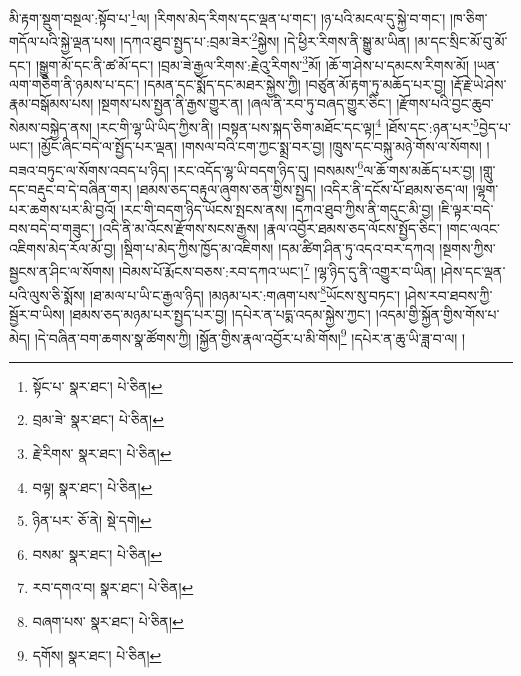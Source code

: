 མི་རྟག་སྡུག་བསྔལ་:སྟོབ་པ་\footnote{སྟོང་པ་  སྣར་ཐང་།  པེ་ཅིན། }ལ། །རིགས་མེད་རིགས་དང་ལྡན་པ་གང་། །ཉ་པའི་མངལ་དུ་སྐྱེ་བ་གང་། །ཁ་ཅིག་གདོལ་པའི་སྐྱེ་ལྡན་པས། །དཀའ་ཐུབ་སྤྱད་པ་:བྲམ་ཟེར་\footnote{བྲམ་ཟེ་  སྣར་ཐང་།  པེ་ཅིན། }སྐྱེས། །དེ་ཕྱིར་རིགས་ནི་སྒྱུ་མ་ཡིན། །མ་དང་སྲིང་མོ་བུ་མོ་དང་། །སྒྱུག་མོ་དང་ནི་ཚ་མོ་དང་། །བྲམ་ཟེ་རྒྱལ་རིགས་:རྗེའུ་རིགས་\footnote{རྗེ་རིགས་  སྣར་ཐང་།  པེ་ཅིན། }མོ། །ཆོ་ག་ཤེས་པ་དམངས་རིགས་མོ། །ཡན་ལག་གཅིག་ནི་ཉམས་པ་དང་། །དམན་དང་སྨོད་དང་མཐར་སྐྱེས་ཀྱི། །བཙུན་མོ་རྟག་ཏུ་མཆོད་པར་བྱ། །རྡོ་རྗེ་ཡེ་ཤེས་རྣམ་བསྒོམས་པས། །སྔགས་པས་སྤྱན་ནི་རྒྱས་གྱུར་ན། །ཞལ་ནི་རབ་ཏུ་བཞད་གྱུར་ཅིང་། །རྫོགས་པའི་བྱང་ཆུབ་སེམས་བསྐྱེད་ནས། །རང་གི་ལྷ་ཡི་ཡིད་ཀྱིས་ནི། །བསྟན་པས་སྐད་ཅིག་མཐོང་དང་ལྟ།\footnote{བལྟ།  སྣར་ཐང་།  པེ་ཅིན། } །ཐོས་དང་:ཉན་པར་\footnote{ཉིན་པར་  ཅོ་ནེ།  སྡེ་དགེ། }བྱེད་པ་ཡང་། །མྱོང་ཞིང་བདེ་ལ་སྤྱོད་པར་ལྡན། །གསལ་བའི་ངག་ཀྱང་སྨྲ་བར་བྱ། །ཁྲུས་དང་བསྐུ་མཉེ་གོས་ལ་སོགས། །བཟའ་བཏུང་ལ་སོགས་འབད་པ་ཉིད། །རང་འདོད་ལྷ་ཡི་བདག་ཉིད་དུ། །བསམས་\footnote{བསམ་  སྣར་ཐང་།  པེ་ཅིན། }ལ་ཆོ་གས་མཆོད་པར་བྱ། །གླུ་དང་བརྡུང་བ་དེ་བཞིན་གར། །ཐམས་ཅད་བརྟུལ་ཞུགས་ཅན་གྱིས་སྤྱད། །འདིར་ནི་དངོས་པོ་ཐམས་ཅད་ལ། །ལྷག་པར་ཆགས་པར་མི་བྱའོ། །རང་གི་བདག་ཉིད་ཡོངས་སྤངས་ནས། །དཀའ་ཐུབ་ཀྱིས་ནི་གདུང་མི་བྱ། །ཇི་ལྟར་བདེ་བས་བདེ་བ་གཟུང་། །འདི་ནི་མ་འོངས་རྫོགས་སངས་རྒྱས། །རྣལ་འབྱོར་ཐམས་ཅད་ལོངས་སྤྱོད་ཅིང་། །གང་ལའང་འཇིགས་མེད་རོལ་མོ་བྱ། །སྡིག་པ་མེད་ཀྱིས་ཁྱོད་མ་འཇིགས། །དམ་ཚིག་ཤིན་ཏུ་འདའ་བར་དཀའ། །སྔགས་ཀྱིས་སྦྱངས་ན་ཤིང་ལ་སོགས། །བེམས་པོ་རྨོངས་བཅས་:རབ་དཀའ་ཡང་།\footnote{རབ་དགའ་བ།  སྣར་ཐང་།  པེ་ཅིན། } །ལྷ་ཉིད་དུ་ནི་འགྱུར་བ་ཡིན། །ཤེས་དང་ལྡན་པའི་ལུས་ཅི་སྨོས། །ཐ་མལ་པ་ཡི་ང་རྒྱལ་ཉིད། །མཉམ་པར་:གཞག་པས་\footnote{བཞག་པས་  སྣར་ཐང་།  པེ་ཅིན། }ཡོངས་སུ་བཏང་། །ཤེས་རབ་ཐབས་ཀྱི་སྦྱོར་བ་ཡིས། །ཐམས་ཅད་མཉམ་པར་སྤྱད་པར་བྱ། །དཔེར་ན་པདྨ་འདམ་སྐྱེས་ཀྱང་། །འདམ་གྱི་སྐྱོན་གྱིས་གོས་པ་མེད། །དེ་བཞིན་བག་ཆགས་སྣ་ཚོགས་ཀྱི། །སྐྱོན་གྱིས་རྣལ་འབྱོར་པ་མི་གོས།\footnote{དགོས།  སྣར་ཐང་།  པེ་ཅིན། } །དཔེར་ན་ཆུ་ཡི་ཟླ་བ་ལ། །
